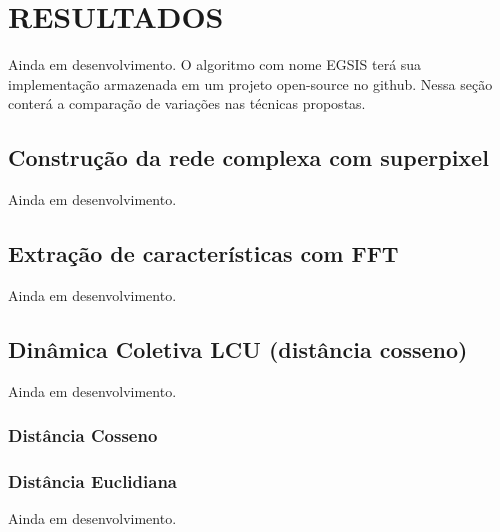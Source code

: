 \chapter{RESULTADOS}\label{chap:resultados}

Ainda em desenvolvimento. O algoritmo com nome EGSIS terá sua
implementação armazenada em um projeto open-source no github. Nessa
seção conterá a comparação de variações nas técnicas propostas.


\section{Construção da rede complexa com superpixel}\label{sec:resultados-rede-complexa-superpixel}

Ainda em desenvolvimento.


\section{Extração de características com FFT}\label{sec:resultados-extracao-de-caracteristicas--fft}

Ainda em desenvolvimento.


\section{Dinâmica Coletiva LCU (distância cosseno)}\label{sec:resultados-dinamica-coletiva-lcu-cos}

Ainda em desenvolvimento.

\subsection{Distância Cosseno}\label{sec:resultados-distancia-cosseno}

\subsection{Distância Euclidiana}\label{sec:resultados-distancia-cosseno}

Ainda em desenvolvimento.
